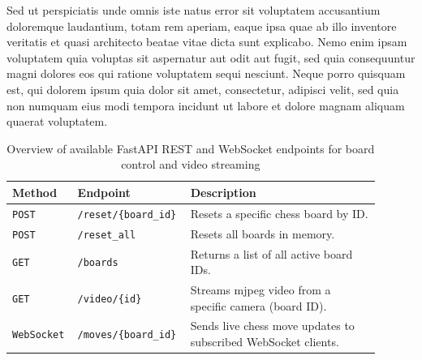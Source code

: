 Sed ut perspiciatis unde omnis iste natus error sit voluptatem accusantium doloremque laudantium, totam rem aperiam, eaque ipsa quae ab illo inventore veritatis et quasi architecto beatae vitae dicta sunt explicabo. Nemo enim ipsam voluptatem quia voluptas sit aspernatur aut odit aut fugit, sed quia consequuntur magni dolores eos qui ratione voluptatem sequi nesciunt. Neque porro quisquam est, qui dolorem ipsum quia dolor sit amet, consectetur, adipisci velit, sed quia non numquam eius modi tempora incidunt ut labore et dolore magnam aliquam quaerat voluptatem.

\begin{table}[h!]
    \centering
    \caption[API endpoint overview]{Overview of available FastAPI REST and WebSocket endpoints for board control and video streaming}
    \label{tab:api-endpoints}
    \begin{tabular}{L{0.15\linewidth}L{0.25\linewidth}L{0.5\linewidth}}
        \toprule
        \textbf{Method} & \textbf{Endpoint} & \textbf{Description} \\
        \midrule
        \texttt{POST} & \texttt{/reset/\{board\_id\}} & Resets a specific chess board by ID. \\
        \texttt{POST} & \texttt{/reset\_all} & Resets all boards in memory. \\
        \texttt{GET} & \texttt{/boards} & Returns a list of all active board IDs. \\
        \texttt{GET} & \texttt{/video/\{id\}} & Streams \gls{mjpeg} video from a specific camera (board ID). \\
        \texttt{WebSocket} & \texttt{/moves/\{board\_id\}} & Sends live chess move updates to subscribed WebSocket clients. \\
        \bottomrule
    \end{tabular}
\end{table}

% 

% 

